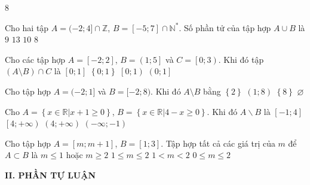 \begin{indapan}{8}
\begin{ex}%
	Cho hai tập $A=(-2; 4] \cap \mathbb{Z}$, $B=[-5; 7] \cap \mathbb{N}^{*}$. Số phần tử của tập hợp $A \cup B$ là
	\choice
	{\True $9$}
	{$13$}
	{$10$}
	{$8$}
	\loigiai{
		$A=(-2; 4] \cap \mathbb{Z}=\{-1;0;1;2;3;4\}$, $B=[-5; 7] \cap \mathbb{N}^{*}=\{1;2;3;4;5;6;7\}$.\\
		Ta có $A \cup B=\{-1;0;1;2;3;4;5;6;7\}$. Vậy tập hợp $A \cup B$ có $9$ phần tử.
	}
\end{ex}
\begin{ex}%
	Cho các tập hợp $A=\left[-2;2\right]$, $B=\left(1;5\right]$ và $ C=\left[0;3\right)$. Khi đó tập $\left(A \setminus B\right)\cap C$ là
	\choice
	{\True $\left[0;1\right]$}
	{$\left\{0;1\right\}$}
	{$\left[0;1\right)$}
	{$\left(0;1\right]$}
\end{ex}
\begin{ex}%
	Cho tập hợp $A=(-2;1]$ và $B=[-2;8)$. Khi đó $A\setminus B$ bằng
	\choice
	{$\left\{ 2 \right\}$}
	{$(1;8) $}
	{$\left\{ 8 \right\}$}
	{\True $\varnothing$}
\end{ex}
\begin{ex}%
	Cho $A=\left\{x\in \mathbb{R}|x+1\ge 0\right\}$, $B=\left\{x\in \mathbb{R}|4-x\ge 0\right\}$. Khi đó $A\backslash B$ là 
	\choice
	{$\left[-1; 4\right]$}
	{$\left[4;+\infty\right)$}
	{\True $\left(4;+\infty\right)$}
	{$\left(-\infty;-1\right)$}
\end{ex}
\begin{ex}%
	Cho tập hợp $A=[m;m+1]$, $B=[1;3]$. Tập hợp tất cả các giá trị của $m$ để $A\subset B$ là
	\choice
	{$m\leq 1$ hoặc $m\geq 2$}
	{\True $1\leq m\leq 2$}
	{$1<m<2$}
	{$0\leq m\leq 2$}
\end{ex}
\noindent\textbf{II. PHẦN TỰ LUẬN}

\end{indapan}
